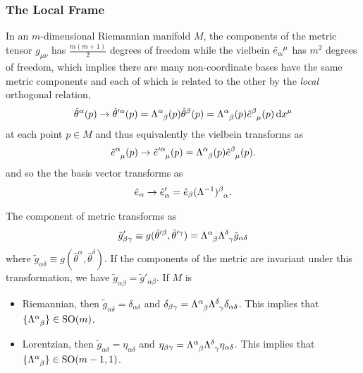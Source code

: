 \documentclass[10pt]{article}
\begin{document}
\subsubsection{The Local Frame}
In an $m$-dimensional Riemannian manifold $M$, the components of the metric tensor $g_{\mu\nu}$ has $\frac{m(m+1)}{2}$ degrees of freedom while the vielbein $\tensor{\tilde{e}}{_\alpha^\mu}$ has $m^2$ degrees of freedom, which implies there are many non-coordinate bases have the same metric components and each of which is related to the other by the \textit{local} orthogonal relation,
\begin{align}
    \hat{\theta}^\alpha(p)\to\hat{\theta}'^\alpha(p)=\tensor{\Lambda}{^\alpha_\beta}(p)\hat{\theta}^\beta(p)=\tensor{\Lambda}{^\alpha_\beta}(p)\tensor{\tilde{e}}{^\beta_\mu}(p)\dd{x^\mu}
\end{align}
at each point $p\in M$ and thus equivalently the vielbein transforms as
\begin{align}
    \tensor{\tilde{e}}{^\alpha_\mu}(p)\to\tilde{e}\indices{^\prime^\alpha_\mu}(p)=\tensor{\Lambda}{^\alpha_\beta}(p)\tensor{\tilde{e}}{^\beta_\mu}(p).
\end{align}
and so the the basis vector transforms as
\begin{align}
    \hat{e}_\alpha\to\hat{e}'_\alpha=\hat{e}_\beta\tensor{(\Lambda^{-1})}{^\beta_\alpha}.
\end{align}

The component of metric transforms as
\begin{align}
    \tilde{g}'_{\beta\gamma}\equiv g(\hat{\theta}'^\beta,\hat{\theta}'^\gamma)=\tensor{\Lambda}{^\alpha_\beta}\tensor{\Lambda}{^\delta_\gamma}\tilde{g}_{\alpha\delta}
\end{align}
where $\tilde{g}_{\alpha\delta}\equiv g(\hat{\theta}^\alpha,\hat{\theta}^\delta)$.
If the components of the metric are invariant under this transformation, we have $\tilde{g}_{\alpha\beta}=\tilde{g}'_{\alpha\beta}$.
If $M$ is
\begin{itemize}
    \item Riemannian, then $\tilde{g}_{\alpha\delta}=\delta_{\alpha\delta}$ and $\delta_{\beta\gamma}=\tensor{\Lambda}{^\alpha_\beta}\tensor{\Lambda}{^\delta_\gamma}\delta_{\alpha\delta}$. This implies that $\{\tensor{\Lambda}{^\alpha_\beta}\}\in\text{SO}(m)$.
    \item Lorentzian, then $\tilde{g}_{\alpha\delta}=\eta_{\alpha\delta}$ and $\eta_{\beta\gamma}=\tensor{\Lambda}{^\alpha_\beta}\tensor{\Lambda}{^\delta_\gamma}\eta_{\alpha\delta}$. This implies that $\{\tensor{\Lambda}{^\alpha_\beta}\}\in\text{SO}(m-1,1)$.
\end{itemize}
\end{document}
